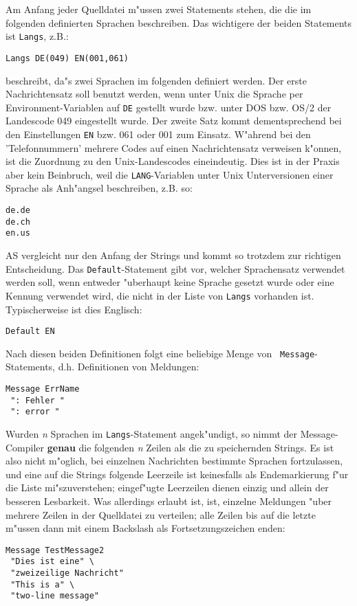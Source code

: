 \documentclass[12pt,a4paper,twoside]{report}
\begin{document}
Am Anfang jeder Quelldatei m"ussen zwei Statements stehen, die die im
folgenden definierten Sprachen beschreiben.  Das wichtigere der beiden
Statements ist {\tt Langs}, z.B.:
\begin{verbatim}
Langs DE(049) EN(001,061)
\end{verbatim}
beschreibt, da"s zwei Sprachen im folgenden definiert werden.  Der erste
Nachrichtensatz soll benutzt werden, wenn unter Unix die Sprache per
Environment-Variablen auf {\tt DE} gestellt wurde bzw. unter DOS bzw. OS/2
der Landescode 049 eingestellt wurde.  Der zweite Satz kommt
dementsprechend bei den Einstellungen {\tt EN} bzw. 061 oder 001 zum
Einsatz.  W"ahrend bei den 'Telefonnummern' mehrere Codes auf einen
Nachrichtensatz verweisen k"onnen, ist die Zuordnung zu den
Unix-Landescodes eineindeutig.  Dies ist in der Praxis aber kein
Beinbruch, weil die {\tt LANG}-Variablen unter Unix Unterversionen einer
Sprache als Anh"angsel beschreiben, z.B. so:
\begin{verbatim}
de.de
de.ch
en.us
\end{verbatim}
AS vergleicht nur den Anfang der Strings und kommt so trotzdem zur
richtigen Entscheidung.
Das {\tt Default}-Statement gibt vor, welcher Sprachensatz verwendet
werden soll, wenn entweder "uberhaupt keine Sprache gesetzt wurde oder
eine Kennung verwendet wird, die nicht in der Liste von {\tt Langs}
vorhanden ist.  Typischerweise ist dies Englisch:
\begin{verbatim}
Default EN
\end{verbatim}
Nach diesen beiden Definitionen folgt eine beliebige Menge von {\tt
Message}-Statements, d.h. Definitionen von Meldungen:
\begin{verbatim}
Message ErrName
 ": Fehler "
 ": error "
\end{verbatim}
Wurden {\em n} Sprachen im {\tt Langs}-Statement angek"undigt, so nimmt
der Message-Compiler {\bf genau} die folgenden {\em n} Zeilen als die zu
speichernden Strings.  Es ist also nicht m"oglich, bei einzelnen
Nachrichten bestimmte Sprachen fortzulassen, und eine auf die Strings
folgende Leerzeile ist keinesfalls als Endemarkierung f"ur die Liste
mi"szuverstehen; eingef"ugte Leerzeilen dienen einzig und allein der
besseren Lesbarkeit.  Was allerdings erlaubt ist, ist, einzelne Meldungen
"uber mehrere Zeilen in der Quelldatei zu verteilen; alle Zeilen bis auf
die letzte m"ussen dann mit einem Backslash als Fortsetzungszeichen enden:
\begin{verbatim}
Message TestMessage2
 "Dies ist eine" \
 "zweizeilige Nachricht"
 "This is a" \
 "two-line message"
\end{verbatim}
\end{document}

